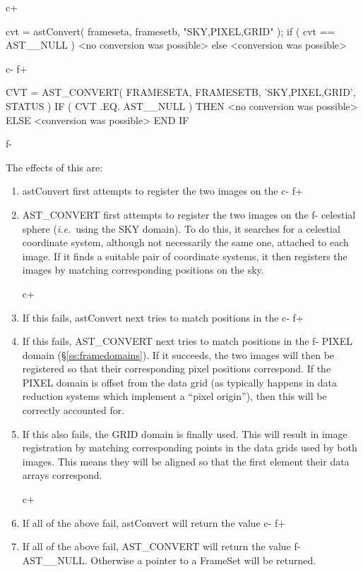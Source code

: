 \documentclass[twoside,11pt]{starlink}
\providecommand{\secref}[1]{\S\ref{#1}}
\begin{document}
{c+
\small
\begin{terminalv}
cvt = astConvert( frameseta, framesetb, "SKY,PIXEL,GRID" );
if ( cvt == AST__NULL ) {
   <no conversion was possible>
} else {
   <conversion was possible>
}
\end{terminalv}
\normalsize
c-
f+
\small
\begin{terminalv}
      CVT = AST_CONVERT( FRAMESETA, FRAMESETB, 'SKY,PIXEL,GRID', STATUS )
      IF ( CVT .EQ. AST__NULL ) THEN
         <no conversion was possible>
      ELSE
         <conversion was possible>
      END IF
\end{terminalv}
\normalsize
f-

The effects of this are:

\begin{enumerate}
c+
\item astConvert first attempts to register the two images on the
c-
f+
\item AST\_CONVERT first attempts to register the two images on the
f-
celestial sphere (\emph{i.e.}\ using the SKY domain). To do this, it
searches for a celestial coordinate system, although not necessarily
the same one, attached to each image.  If it finds a suitable pair of
coordinate systems, it then registers the images by matching
corresponding positions on the sky.

c+
\item If this fails, astConvert next tries to match positions in the
c-
f+
\item If this fails, AST\_CONVERT next tries to match positions in the
f-
PIXEL domain (\secref{ss:framedomains}). If it succeeds, the two
images will then be registered so that their corresponding pixel
positions correspond. If the PIXEL domain is offset from the data grid
(as typically happens in data reduction systems which implement a
``pixel origin''), then this will be correctly accounted for.

\item If this also fails, the GRID domain is finally used. This will
result in image registration by matching corresponding points in the
data grids used by both images. This means they will be
aligned so that the first element their data arrays correspond.

c+
\item If all of the above fail, astConvert will return the value
c-
f+
\item If all of the above fail, AST\_CONVERT will return the value
f-
AST\_\_NULL. Otherwise a pointer to a FrameSet will be returned.
\end{enumerate}

}
\end{document}
